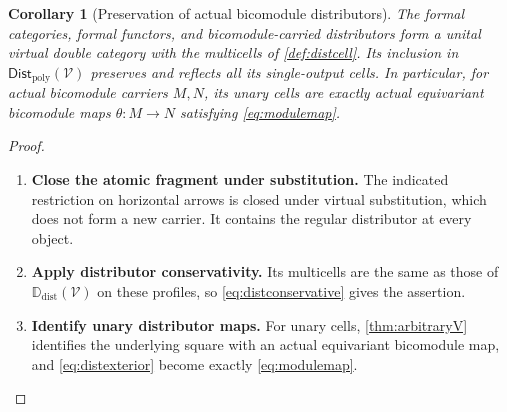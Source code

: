 \documentclass[11pt,reqno]{amsart}
\theoremstyle{plain}
\newtheorem{corollary}[theorem]{Corollary}
\theoremstyle{definition}
\theoremstyle{remark}
\numberwithin{equation}{section}
\newcommand{\V}{\mathcal V}
\newcommand{\Ddist}{\mathbb D_{\mathrm{dist}}}
\newcommand{\FDist}{\mathsf{Dist}_{\mathrm{poly}}}
\begin{document}
\begin{corollary}[Preservation of actual bicomodule distributors]\label{cor:atomicdistributors}
The formal categories, formal functors, and bicomodule-carried distributors
form a unital virtual double category with the multicells of
\cref{def:distcell}. Its inclusion in $\FDist(\V)$ preserves and
reflects all its single-output cells. In particular, for actual bicomodule carriers
$M,N$, its unary cells are exactly actual equivariant bicomodule maps
$\theta:M\to N$ satisfying \cref{eq:modulemap}.
\end{corollary}
\begin{proof}\leavevmode
\begin{enumerate}
\item \textbf{Close the atomic fragment under substitution.} The indicated restriction on horizontal arrows is closed under virtual
substitution, which does not form a new carrier. It contains the regular
distributor at every object.

\item \textbf{Apply distributor conservativity.} Its multicells are the same as those of
$\Ddist(\V)$ on these profiles, so \cref{eq:distconservative}
gives the assertion.

\item \textbf{Identify unary distributor maps.} For unary cells, \cref{thm:arbitraryV} identifies
the underlying square with an actual equivariant bicomodule map, and
\cref{eq:distexterior} become exactly
\cref{eq:modulemap}.\qedhere
\end{enumerate}
\end{proof}
\end{document}
